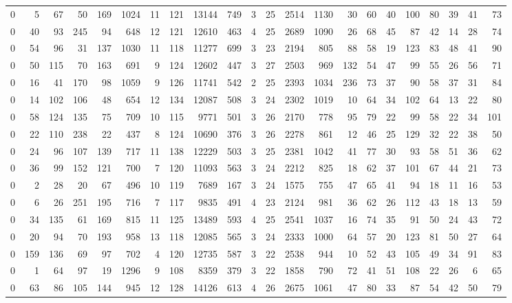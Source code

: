 {\begin{landscape}
\begin{longtable}[c]{lrrrrrrrrrrrrrrrrrrrrr}
0 & 5 & 67 & 50 & 169 & 1024 & 11 & 121 & 13144 & 749 & 3 & 25 & 2514 & 1130 & 30 & 60 & 40 & 100 & 80 & 39 & 41 & 73 \\
0 & 40 & 93 & 245 & 94 & 648 & 12 & 121 & 12610 & 463 & 4 & 25 & 2689 & 1090 & 26 & 68 & 45 & 87 & 42 & 14 & 28 & 74 \\
0 & 54 & 96 & 31 & 137 & 1030 & 11 & 118 & 11277 & 699 & 3 & 23 & 2194 & 805 & 88 & 58 & 19 & 123 & 83 & 48 & 41 & 90 \\
0 & 50 & 115 & 70 & 163 & 691 & 9 & 124 & 12602 & 447 & 3 & 27 & 2503 & 969 & 132 & 54 & 47 & 99 & 55 & 26 & 56 & 71 \\
0 & 16 & 41 & 170 & 98 & 1059 & 9 & 126 & 11741 & 542 & 2 & 25 & 2393 & 1034 & 236 & 73 & 37 & 90 & 58 & 37 & 31 & 84 \\
0 & 14 & 102 & 106 & 48 & 654 & 12 & 134 & 12087 & 508 & 3 & 24 & 2302 & 1019 & 10 & 64 & 34 & 102 & 64 & 13 & 22 & 80 \\
0 & 58 & 124 & 135 & 75 & 709 & 10 & 115 & 9771 & 501 & 3 & 26 & 2170 & 778 & 95 & 79 & 22 & 99 & 58 & 22 & 34 & 101 \\
0 & 22 & 110 & 238 & 22 & 437 & 8 & 124 & 10690 & 376 & 3 & 26 & 2278 & 861 & 12 & 46 & 25 & 129 & 32 & 22 & 38 & 50 \\
0 & 24 & 96 & 107 & 139 & 717 & 11 & 138 & 12229 & 503 & 3 & 25 & 2381 & 1042 & 41 & 77 & 30 & 93 & 58 & 51 & 36 & 62 \\
0 & 36 & 99 & 152 & 121 & 700 & 7 & 120 & 11093 & 563 & 3 & 24 & 2212 & 825 & 18 & 62 & 37 & 101 & 67 & 44 & 21 & 73 \\
0 & 2 & 28 & 20 & 67 & 496 & 10 & 119 & 7689 & 167 & 3 & 24 & 1575 & 755 & 47 & 65 & 41 & 94 & 18 & 11 & 16 & 53 \\
0 & 6 & 26 & 251 & 195 & 716 & 7 & 117 & 9835 & 491 & 4 & 23 & 2124 & 981 & 36 & 62 & 26 & 112 & 43 & 18 & 13 & 59 \\
0 & 34 & 135 & 61 & 169 & 815 & 11 & 125 & 13489 & 593 & 4 & 25 & 2541 & 1037 & 16 & 74 & 35 & 91 & 50 & 24 & 43 & 72 \\
0 & 20 & 94 & 70 & 193 & 958 & 13 & 118 & 12085 & 565 & 3 & 24 & 2333 & 1000 & 64 & 57 & 20 & 123 & 81 & 50 & 27 & 64 \\
0 & 159 & 136 & 69 & 97 & 702 & 4 & 120 & 12735 & 587 & 3 & 22 & 2538 & 944 & 10 & 52 & 43 & 105 & 49 & 34 & 91 & 83 \\
0 & 1 & 64 & 97 & 19 & 1296 & 9 & 108 & 8359 & 379 & 3 & 22 & 1858 & 790 & 72 & 41 & 51 & 108 & 22 & 26 & 6 & 65 \\
0 & 63 & 86 & 105 & 144 & 945 & 12 & 128 & 14126 & 613 & 4 & 26 & 2675 & 1061 & 47 & 80 & 33 & 87 & 54 & 42 & 50 & 79 \\

\end{longtable}
\end{landscape}}
